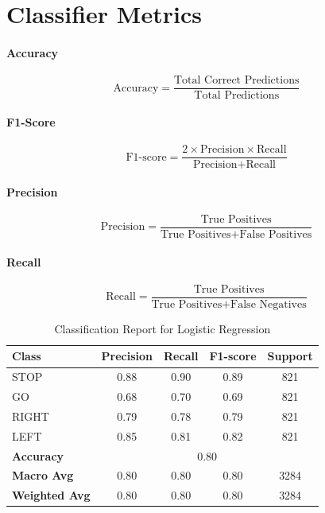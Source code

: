 \section*{Classifier Metrics}
\label{appendix:classifier}

\paragraph{Accuracy}
$$
\text{Accuracy} = \frac{\text{Total Correct Predictions}}{\text{Total Predictions}}
$$

\paragraph{F1-Score}
$$
\text{F1-score} = \frac{2 \times \text{Precision} \times \text{Recall}}{\text{Precision} + \text{Recall}}
$$

\paragraph{Precision}
$$
\text{Precision} = \frac{\text{True Positives}}{\text{True Positives} + \text{False Positives}}
$$

\paragraph{Recall}
$$
\text{Recall} = \frac{\text{True Positives}}{\text{True Positives} + \text{False Negatives}}
$$

\begin{table}[h]
\centering
\caption{Classification Report for Logistic Regression}
\begin{tabular}{lcccc}
\hline
\textbf{Class} & \textbf{Precision} & \textbf{Recall} & \textbf{F1-score} & \textbf{Support} \\
\hline
STOP  & 0.88 & 0.90 & 0.89 & 821 \\
GO    & 0.68 & 0.70 & 0.69 & 821 \\
RIGHT & 0.79 & 0.78 & 0.79 & 821 \\
LEFT  & 0.85 & 0.81 & 0.82 & 821 \\
\hline
\textbf{Accuracy} & \multicolumn{4}{c}{0.80} \\
\textbf{Macro Avg} & 0.80 & 0.80 & 0.80 & 3284 \\
\textbf{Weighted Avg} & 0.80 & 0.80 & 0.80 & 3284 \\
\hline
\end{tabular}
\label{tab:classification_report}
\end{table}


